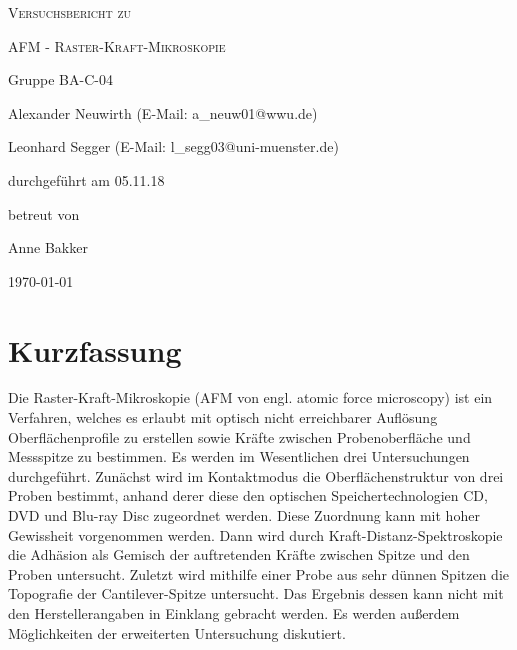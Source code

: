 \documentclass[
	a4paper,
	12pt,
	pagesize,
	ngerman
]{scrartcl}
\begin{document}
	\begin{titlepage}
		\centering
		{\scshape\LARGE Versuchsbericht zu \par}
		\vspace{1cm}
		{\scshape\huge AFM - Raster-Kraft-Mikroskopie \par}
		\vspace{2.5cm}
		{\LARGE Gruppe BA-C-04 \par}
		\vspace{0.5cm}

		{\large Alexander Neuwirth (E-Mail: a\_neuw01@wwu.de) \par}
		{\large Leonhard Segger (E-Mail: l\_segg03@uni-muenster.de) \par}
		\vfill

		durchgeführt am 05.11.18\par
		betreut von\par
		{\large Anne Bakker}

		\vfill

		{\large \today\par}
	\end{titlepage}
	\tableofcontents
	\newpage


	\section{Kurzfassung}
	Die Raster-Kraft-Mikroskopie (AFM von engl. atomic force microscopy) ist ein Verfahren, welches es erlaubt mit optisch nicht erreichbarer Auflösung Oberflächenprofile zu erstellen sowie Kräfte zwischen Probenoberfläche und Messspitze zu bestimmen.
	Es werden im Wesentlichen drei Untersuchungen durchgeführt.
	Zunächst wird im Kontaktmodus die Oberflächenstruktur von drei Proben bestimmt, anhand derer diese den optischen Speichertechnologien CD, DVD und Blu-ray Disc zugeordnet werden.
	Diese Zuordnung kann mit hoher Gewissheit vorgenommen werden.
	Dann wird durch Kraft-Distanz-Spektroskopie die Adhäsion als Gemisch der auftretenden Kräfte zwischen Spitze und den Proben untersucht.
	Zuletzt wird mithilfe einer Probe aus sehr dünnen Spitzen die Topografie der Cantilever-Spitze untersucht.
	Das Ergebnis dessen kann nicht mit den Herstellerangaben in Einklang gebracht werden.
	Es werden außerdem Möglichkeiten der erweiterten Untersuchung diskutiert.
\end{document}
